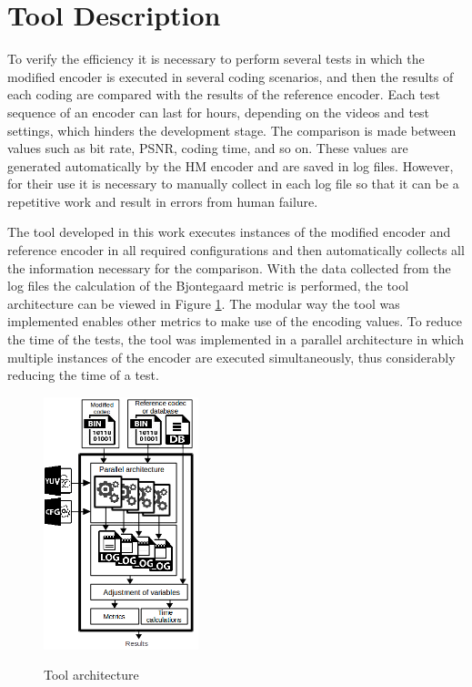 \documentclass{acm_proc_article-sp}
\begin{document}
\section{Tool Description}

To verify the efficiency it is necessary to perform several tests in which the modified encoder is executed in several coding scenarios, and then the results of each coding are compared with the results of the reference encoder. Each test sequence of an encoder can last for hours, depending on the videos and test settings, which hinders the development stage. The comparison is made between values such as bit rate, PSNR, coding time, and so on. These values are generated automatically by the HM encoder and are saved in log files. However, for their use it is necessary to manually collect in each log file so that it can be a repetitive work and result in errors from human failure. 

The tool developed in this work executes instances of the modified encoder and reference encoder in all required configurations and then automatically collects all the information necessary for the comparison. With the data collected from the log files the calculation of 
the Bjontegaard \cite{Bjontegaard} metric is performed, the tool architecture can be viewed in Figure \ref{fig:fluxo}. The modular way the tool was implemented enables other metrics to make use of the encoding values. To reduce the time of the tests, the tool was implemented in a parallel architecture in which multiple instances of the encoder are executed simultaneously, thus considerably reducing the time of a test.

\FloatBarrier
\begin{figure}[!ht]
	\centering
	\caption{Tool architecture}
	\includegraphics[width=0.4\textwidth]{figures/fluxo.png}
	\label{fig:fluxo}	
\end{figure}
\FloatBarrier
\end{document}
